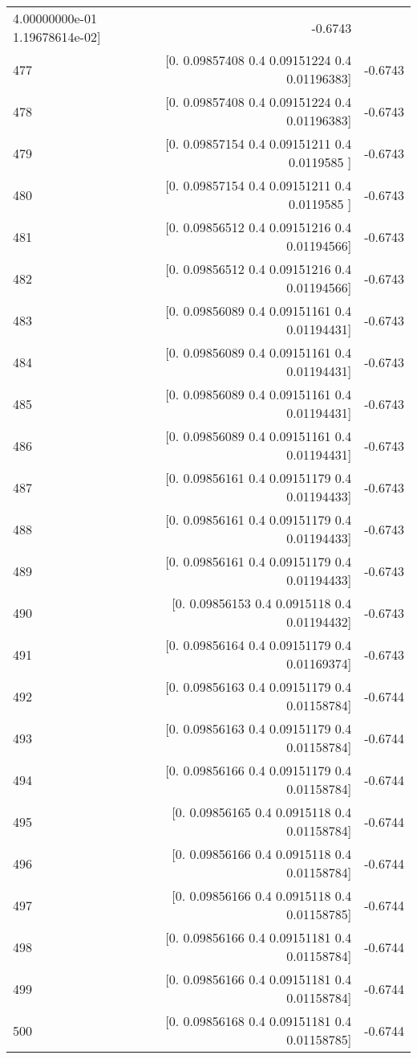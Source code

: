 \begin{longtable}{lrr}
 4.00000000e-01 1.19678614e-02] & -0.6743 \\
477 & [0.         0.09857408 0.4        0.09151224 0.4        0.01196383] & -0.6743 \\
478 & [0.         0.09857408 0.4        0.09151224 0.4        0.01196383] & -0.6743 \\
479 & [0.         0.09857154 0.4        0.09151211 0.4        0.0119585 ] & -0.6743 \\
480 & [0.         0.09857154 0.4        0.09151211 0.4        0.0119585 ] & -0.6743 \\
481 & [0.         0.09856512 0.4        0.09151216 0.4        0.01194566] & -0.6743 \\
482 & [0.         0.09856512 0.4        0.09151216 0.4        0.01194566] & -0.6743 \\
483 & [0.         0.09856089 0.4        0.09151161 0.4        0.01194431] & -0.6743 \\
484 & [0.         0.09856089 0.4        0.09151161 0.4        0.01194431] & -0.6743 \\
485 & [0.         0.09856089 0.4        0.09151161 0.4        0.01194431] & -0.6743 \\
486 & [0.         0.09856089 0.4        0.09151161 0.4        0.01194431] & -0.6743 \\
487 & [0.         0.09856161 0.4        0.09151179 0.4        0.01194433] & -0.6743 \\
488 & [0.         0.09856161 0.4        0.09151179 0.4        0.01194433] & -0.6743 \\
489 & [0.         0.09856161 0.4        0.09151179 0.4        0.01194433] & -0.6743 \\
490 & [0.         0.09856153 0.4        0.0915118  0.4        0.01194432] & -0.6743 \\
491 & [0.         0.09856164 0.4        0.09151179 0.4        0.01169374] & -0.6743 \\
492 & [0.         0.09856163 0.4        0.09151179 0.4        0.01158784] & -0.6744 \\
493 & [0.         0.09856163 0.4        0.09151179 0.4        0.01158784] & -0.6744 \\
494 & [0.         0.09856166 0.4        0.09151179 0.4        0.01158784] & -0.6744 \\
495 & [0.         0.09856165 0.4        0.0915118  0.4        0.01158784] & -0.6744 \\
496 & [0.         0.09856166 0.4        0.0915118  0.4        0.01158784] & -0.6744 \\
497 & [0.         0.09856166 0.4        0.0915118  0.4        0.01158785] & -0.6744 \\
498 & [0.         0.09856166 0.4        0.09151181 0.4        0.01158784] & -0.6744 \\
499 & [0.         0.09856166 0.4        0.09151181 0.4        0.01158784] & -0.6744 \\
500 & [0.         0.09856168 0.4        0.09151181 0.4        0.01158785] & -0.6744 \\
\end{longtable}